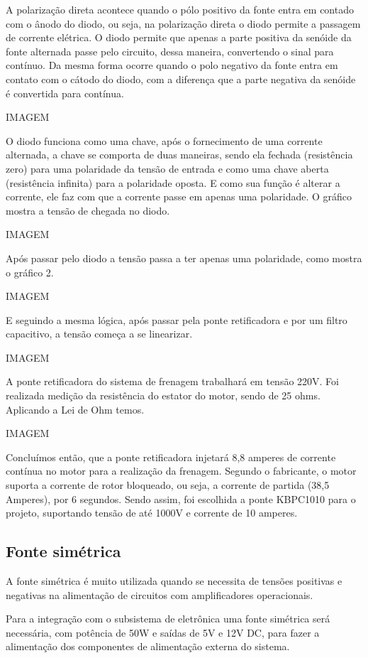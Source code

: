 A polarização direta acontece quando o pólo positivo da fonte entra em contado com o ânodo do diodo, ou seja, na polarização direta o diodo permite a passagem de corrente elétrica. O diodo permite que apenas a parte positiva da senóide da fonte alternada passe pelo circuito, dessa maneira, convertendo o sinal para contínuo. Da mesma forma ocorre quando o polo negativo da fonte entra em contato com o cátodo do diodo, com a diferença que a parte negativa da senóide é convertida para contínua.

IMAGEM

O diodo funciona como uma chave, após o fornecimento de uma corrente alternada, a chave se comporta de duas maneiras, sendo ela fechada (resistência zero) para uma polaridade da tensão de entrada e como uma chave aberta (resistência infinita) para a polaridade oposta. E como sua função é alterar a corrente, ele faz com que a corrente passe em apenas uma polaridade. O gráfico mostra a tensão de chegada no diodo.

IMAGEM

Após passar pelo diodo a tensão passa a ter apenas uma polaridade, como mostra o gráfico 2.

IMAGEM

E seguindo a mesma lógica, após passar pela ponte retificadora e por um filtro capacitivo,  a tensão começa a se linearizar.

IMAGEM

A ponte retificadora do sistema de frenagem trabalhará em tensão 220V. Foi realizada medição da resistência do estator do motor, sendo de 25 ohms. Aplicando a Lei de Ohm temos.

IMAGEM

Concluímos então, que a ponte retificadora injetará 8,8 amperes de corrente contínua no motor para a realização da frenagem. Segundo o fabricante, o motor suporta a corrente de rotor bloqueado, ou seja, a corrente de partida (38,5 Amperes), por 6 segundos. Sendo assim, foi escolhida a ponte KBPC1010 para o projeto, suportando tensão de até 1000V e corrente de 10 amperes.

\subsection{Fonte simétrica}
A fonte simétrica é muito utilizada  quando se necessita de tensões positivas e negativas na alimentação de circuitos com amplificadores operacionais. 

Para a integração com o subsistema de eletrônica uma fonte simétrica será necessária, com potência de 50W e saídas de 5V e 12V DC, para fazer a alimentação dos componentes de alimentação externa do sistema.

